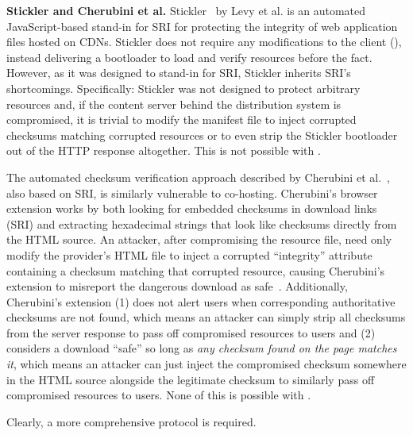 \noindent\textbf{Stickler and Cherubini et al.} Stickler~\cite{Stickler} by Levy
et al. is an automated JavaScript-based stand-in for SRI for protecting the
integrity of web application files hosted on CDNs. Stickler does not require any
modifications to the client (), instead delivering a bootloader
to load and verify resources before the fact. However, as it was designed to
stand-in for SRI, Stickler inherits SRI's shortcomings. Specifically: Stickler
was not designed to protect arbitrary resources and, if the content server
behind the distribution system is compromised, it is trivial to modify the
manifest file to inject corrupted checksums matching corrupted resources or to
even strip the Stickler bootloader out of the HTTP response altogether. This is
not possible with \SYSTEM{}.

The automated checksum verification approach described by Cherubini et
al.~\cite{Cherubini}, also based on SRI, is similarly vulnerable to co-hosting.
Cherubini's browser extension works by both looking for embedded checksums in
download links (SRI) and extracting hexadecimal strings that look like checksums
directly from the HTML source. An attacker, after compromising the resource
file, need only modify the provider's HTML file to inject a corrupted
``integrity'' attribute containing a checksum matching that corrupted resource,
causing Cherubini's extension to misreport the dangerous download as
safe~\cite{Cherubini}. Additionally, Cherubini's extension (1) does not alert
users when corresponding authoritative checksums are not found, which means an
attacker can simply strip all checksums from the server response to pass off
compromised resources to users and (2) considers a download ``safe'' so long as
\emph{any checksum found on the page matches it}, which means an attacker can
just inject the compromised checksum somewhere in the HTML source alongside the
legitimate checksum to similarly pass off compromised resources to users. None
of this is possible with \SYSTEM{}.

Clearly, a more comprehensive protocol is required.
